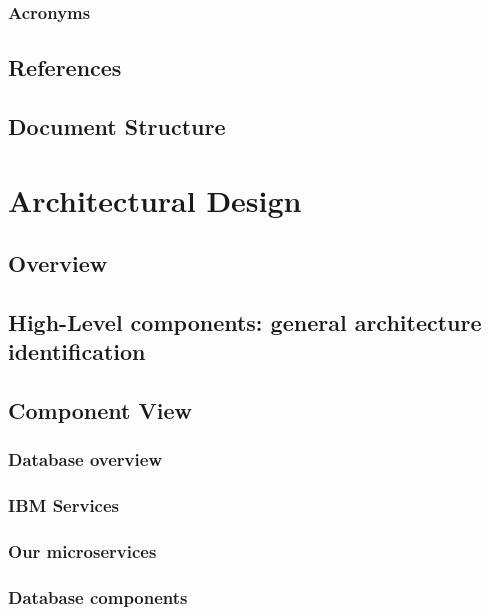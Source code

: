 \documentclass[12pt]{article}
\begin{document}
\subsubsection{Acronyms}



\subsection{References}

\clearpage
\subsection{Document Structure}

\clearpage

\section{Architectural Design}

\subsection{Overview}

\subsection{High-Level components: general architecture identification}\label{higharch}

\subsection{Component View}\label{componentview}
\subsubsection{Database overview}

\subsubsection{IBM Services}\label{microservices}

\clearpage
\subsubsection{Our microservices}\label{ourservices}

\subsubsection{Database components}\label{databasecomponent}

\end{document}
